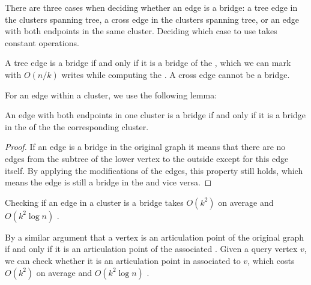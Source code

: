 


There are three cases when deciding whether an edge is a bridge: a tree edge in the clusters spanning tree, a cross edge in the clusters spanning tree, or an edge with both endpoints in the same cluster.
Deciding which case to use takes constant operations.

A tree edge is a bridge if and only if it is a bridge of the \clustergraph{}, which we can mark with $O(n/k)$ writes while computing the \imprep{}. A cross edge cannot be a bridge.

For an edge within a cluster, we use the following lemma:
\begin{lemma}\label{lem:bridge-clust}
An edge with both endpoints in one cluster is a bridge if and only if it is a bridge in the \localgraph{} of the the corresponding cluster.
\end{lemma}
\begin{proof}
If an edge is a bridge in the original graph it means that there are no edges from the subtree of the lower vertex to the outside except for this edge itself.  By applying the modifications of the edges, this property still holds, which means the edge is still a bridge in the \localgraph{} and vice versa.
\end{proof}

Checking if an edge in a cluster is a bridge takes $O(k^2)$ on average and $O(k^2\log n)$ \whp{}.

  By a similar argument that a vertex is an articulation point of the original graph if and only if it is an articulation point of the associated \localgraph{}.
Given a query vertex $v$, we can check whether it is an articulation point in \localgraph{} associated to $v$, which costs $O(k^2)$ on average and $O(k^2\log n)$ \whp{}.

